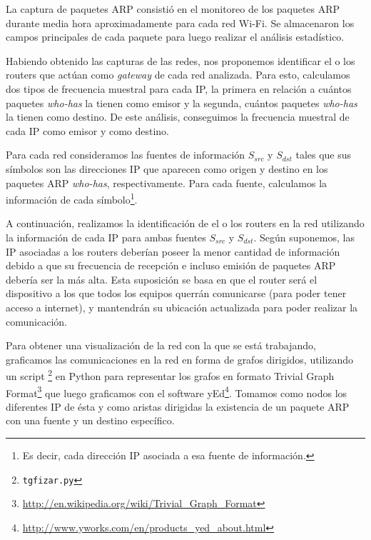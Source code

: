 \documentclass[a4paper, 10pt, twoside]{article}
\begin{document}
La captura de paquetes ARP consistió en el monitoreo de los paquetes ARP durante media hora aproximadamente para cada red Wi-Fi. Se almacenaron los campos principales de cada paquete para luego realizar el análisis estadístico.

Habiendo obtenido las capturas de las redes, nos proponemos identificar el o los routers que actúan como \textit{gateway} de cada red analizada. Para esto, calculamos dos tipos de frecuencia muestral para cada IP, la primera en relación a cuántos paquetes \textit{who-has} la tienen como emisor y la segunda, cuántos paquetes \textit{who-has} la tienen como destino. De este análisis, conseguimos la frecuencia muestral de cada IP como emisor y como destino.

Para cada red consideramos las fuentes de información $S_{src}$ y $S_{dst}$ tales que sus símbolos son las direcciones IP que aparecen como origen y destino en los paquetes ARP \textit{who-has}, respectivamente. Para cada fuente, calculamos la información de cada símbolo\footnote{Es decir, cada dirección IP asociada a esa fuente de información.}.

A continuación, realizamos la identificación de el o los routers en la red utilizando la información de cada IP para ambas fuentes $S_{src}$ y $S_{dst}$. Según suponemos, las IP asociadas a los routers deberían poseer la menor cantidad de información debido a que su frecuencia de recepción e incluso emisión de paquetes ARP debería ser la más alta. Esta suposición se basa en que el router será el dispositivo a los que todos los equipos querrán comunicarse (para poder tener acceso a internet), y mantendrán su ubicación actualizada para poder realizar la comunicación.

Para obtener una visualización de la red con la que se está trabajando, graficamos las comunicaciones en la red en forma de grafos dirigidos, utilizando un script \footnote{\texttt{tgfizar.py}} en Python para representar los grafos en formato Trivial Graph Format\footnote{\url{http://en.wikipedia.org/wiki/Trivial_Graph_Format}} que luego graficamos con el software yEd\footnote{\url{http://www.yworks.com/en/products_yed_about.html}}. Tomamos como nodos los diferentes IP de ésta y como aristas dirigidas la existencia de un paquete ARP con una fuente y un destino específico.


\end{document}
